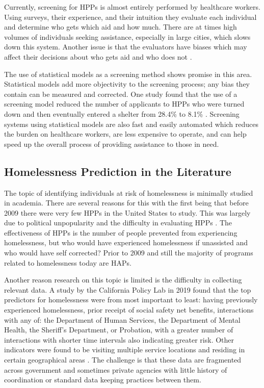 \documentclass[utf8]{frontiersFPHY} %
\begin{document}
Currently, screening for HPPs is almost entirely performed by healthcare workers. Using surveys, their experience, and their intuition they evaluate each individual and determine who gets which aid and how much. There are at times high volumes of individuals seeking assistance, especially in large cities, which slows down this system. Another issue is that the evaluators have biases which may affect their decisions about who gets aid and who does not \cite{shinn2019homelessness}.

The use of statistical models as a screening method shows promise in this area. Statistical models add more objectivity to the screening process; any bias they contain can be measured and corrected. One study found that the use of a screening model reduced the number of applicants to HPPs who were turned down and then eventually entered a shelter from 28.4\% to 8.1\% \cite{shinn2019homelessness}. Screening systems using statistical models are also fast and easily automated which reduces the burden on healthcare workers, are less expensive to operate, and can help speed up the overall process of providing assistance to those in need.

\subsection*{Homelessness Prediction in the Literature}
The topic of identifying individuals at risk of homelessness is minimally studied in academia. There are several reasons for this with the first being that before 2009 there were very few HPPs in the United States to study. This was largely due to political unpopularity and the difficulty in evaluating HPPs \cite{colburn2014federal}. The effectiveness of HPPs is the number of people prevented from experiencing homelessness, but who would have experienced homelessness if unassisted and who would have self corrected? Prior to 2009 and still the majority of programs related to homelessness today are HAPs. 

Another reason research on this topic is limited is the difficulty in collecting relevant data. A study by the California Policy Lab in 2019 found that the top predictors for homelessness were from most important to least: having previously experienced homelessness, prior receipt of social safety net benefits, interactions with any of: the Department of Human Services, the Department of Mental Health, the Sheriff's Department, or Probation, with a greater number of interactions with shorter time intervals also indicating greater risk. Other indicators were found to be visiting multiple service locations and residing in certain geographical areas \cite{PredictPreventHmlsnsLA}. The challenge is that these data are fragmented across government and sometimes private agencies with little history of coordination or standard data keeping practices between them.
\end{document}
